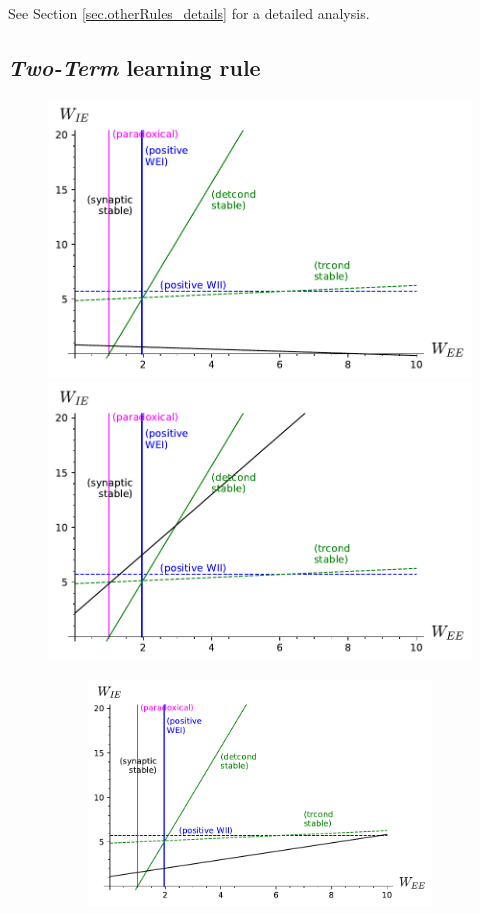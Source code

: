 \documentclass[twocolumn]{article}
\begin{document}
See Section \ref{sec.otherRules_details} for a detailed analysis.



\subsection{{\em Two-Term} learning rule}



\begin{figure}[!ht]
\centering
\parbox[c]{\columnwidth}{
\includegraphics[width=\columnwidth]{TT_stability_slowHomeo.pdf}
\includegraphics[width=\columnwidth]{TT_stability_slowCross.pdf}}
\parbox[c]{\columnwidth}{
\begin{figure}[H]
\includegraphics[width=\columnwidth]{TT_stability_equal.pdf}

\end{figure}}
\end{figure}
\end{document}
